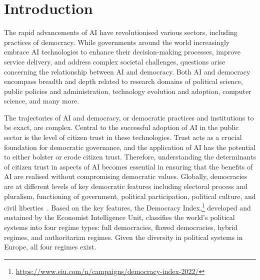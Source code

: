 \documentclass[
]{ceurart}
\begin{document}
\section{Introduction}
The rapid advancements of AI have revolutionised various sectors, including practices of democracy. While governments around the world increasingly embrace AI technologies to enhance their decision-making processes, improve service delivery, and address complex societal challenges, questions arise concerning the relationship between AI and democracy. Both AI and democracy encompass breadth and depth related to research domains of political science, public policies and administration, technology evolution and adoption, computer science, and many more.

The trajectories of AI and democracy, or democratic practices and institutions to be exact, are complex. Central to the successful adoption of AI in the public sector is the level of citizen trust in these technologies. Trust acts as a crucial foundation for democratic governance, and the application of AI has the potential to either bolster or erode citizen trust. Therefore, understanding the determinants of citizen trust in aspects of AI becomes essential in ensuring that the benefits of AI are realised without compromising democratic values. Globally, democracies are at different levels of key democratic features including electoral process and pluralism, functioning of government, political participation, political culture, and civil liberties~\cite{unit2022democracy}. Based on the key features, the Democracy Index,\footnote{\url{https://www.eiu.com/n/campaigns/democracy-index-2022/}} developed and sustained by the Economist Intelligence Unit, classifies the world's political systems into four regime types: full democracies, flawed democracies, hybrid regimes, and authoritarian regimes. Given the diversity in political systems in Europe, all four regimes exist. 
\end{document}
